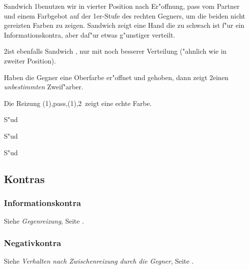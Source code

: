 Sandwich 1\NT benutzen wir in vierter Position nach Er"offnung, pass vom
Partner und einem Farbgebot auf der 1er-Stufe des rechten Gegners, um die
beiden nicht gereizten Farben zu zeigen.
Sandwich \nt zeigt eine Hand die zu schwach ist f"ur ein
Informationskontra, aber daf"ur etwas g"unstiger verteilt.

2\SA ist ebenfalls Sandwich \nt, nur mit noch besserer Verteilung
("ahnlich wie  in zweiter Position).

Haben die Gegner eine Oberfarbe er"offnet und gehoben, dann zeigt 2\SA einen
\emph{unbestimmten} Zweif"arber.

Die Reizung (1\kar){}\sep pass{}\sep(1\pik){}\sep2\pik\ zeigt eine echte Farbe.

\dealerW
S"ud \\

S"ud \\

S"ud \\

\subsection{Kontras}

\subsubsection{Informationskontra}

Siehe \emph{Gegenreizung}, Seite \pageref{gegenreizung}.

\subsubsection{Negativkontra}

Siehe \emph{Verhalten nach Zwischenreizung durch die Gegner}, Seite
\pageref{zwischenreizung}.

